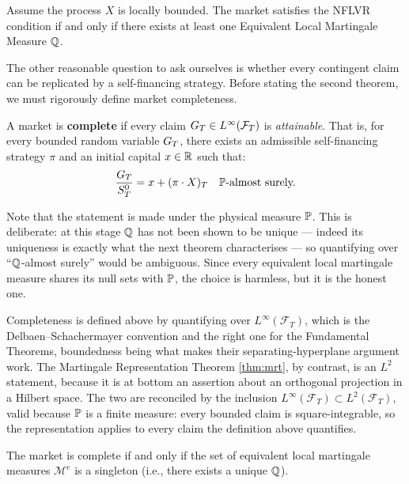 \begin{theorem}\label{thm:firstFTAP}
Assume the process $X$ is locally bounded. The market satisfies the NFLVR condition if and only if there exists at least one Equivalent Local Martingale Measure $\mathbb{Q}$. \qedopentext
\end{theorem}

The other reasonable question to ask ourselves is whether every contingent claim can be replicated by a self-financing strategy. Before stating the second theorem, we must rigorously define market completeness.

\begin{definition}
A market is \textbf{complete} if every claim $G_T \in L^\infty(\mathcal{F}_T)$ is \textit{attainable}. That is, for every bounded random variable $G_T$, there exists an admissible self-financing strategy $\pi$ and an initial capital $x \in \mathbb{R}$ such that:
\begin{equation}
    \frac{G_T}{S^0_T} = x + (\pi \cdot X)_T \quad \mathbb{P}\text{-almost surely.}
\end{equation}
\end{definition}

Note that the statement is made under the physical measure $\mathbb{P}$. This is deliberate: at this stage $\mathbb{Q}$ has not been shown to be unique --- indeed its uniqueness is exactly what the next theorem characterises --- so quantifying over ``$\mathbb{Q}$-almost surely'' would be ambiguous. Since every equivalent local martingale measure shares its null sets with $\mathbb{P}$, the choice is harmless, but it is the honest one.

Completeness is defined above by quantifying over $L^\infty(\mathcal{F}_T)$, which is the Delbaen--Schachermayer convention and the right one for the Fundamental Theorems, boundedness being what makes their separating-hyperplane argument work. The Martingale Representation Theorem \ref{thm:mrt}, by contrast, is an $L^2$ statement, because it is at bottom an assertion about an orthogonal projection in a Hilbert space. The two are reconciled by the inclusion $L^\infty(\mathcal{F}_T) \subset L^2(\mathcal{F}_T)$, valid because $\mathbb{P}$ is a finite measure: every bounded claim is square-integrable, so the representation applies to every claim the definition above quantifies. 

\begin{theorem}\label{thm:secondFTAP} The market is complete if and only if the set of equivalent local martingale measures $\mathcal{M}^e$ is a singleton (i.e., there exists a unique $\mathbb{Q}$).\qedopentext
\end{theorem}

